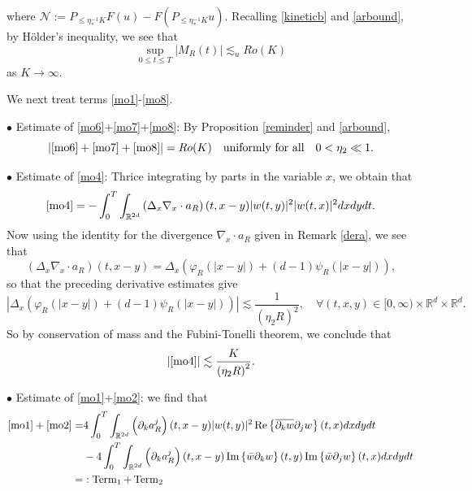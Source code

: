 \documentclass[reqno,11pt]{amsart}
\theoremstyle{plain}
\theoremstyle{definition}
\newcommand{\qtq}[1]{\quad\text{#1}\quad}
\numberwithin{equation}{section}
\numberwithin{theorem}{section}
\def\leq{\leqslant}
\begin{document}
where $\mathcal{N}:=P_{\leq \eta_{\ast}^{-1}K}F(u)-F(P_{\leq \eta_{\ast}^{-1}K}u)$. Recalling \eqref{kineticb} and \eqref{arbound}, by H\"older's inequality, we see that
\begin{equation}\label{F-est1}
    \sup_{0\leq t\leq T}|M_{R}(t)|\lesssim_u Ro(K)
\end{equation}
as $K\to\infty$.

We next treat  terms \eqref{mo1}-\eqref{mo8}.

$\bullet$ Estimate of \eqref{mo6}+\eqref{mo7}+\eqref{mo8}: By Proposition \ref{reminder} and \eqref{arbound}, 
    \begin{equation}\label{F-est2}
        |\eqref{mo6}+\eqref{mo7}+\eqref{mo8}|=Ro(K)\qtq{uniformly for all}0<\eta_2\ll1.
    \end{equation}


$\bullet$ Estimate of \eqref{mo4}: Thrice integrating by parts in the variable $x$, we obtain that
\begin{equation*}
\eqref{mo4}=-\int_{0}^{T} \int_{\mathbb{R}^{2d}}\left(\Delta_{x} \nabla_{x} \cdot a_{R}\right)(t, x-y)|w(t, y)|^{2}|w(t, x)|^{2} d x d y d t.
\end{equation*}
Now using the identity for the divergence $\nabla_{x} \cdot a_{R}$ given in Remark \ref{dera}, we see that
\begin{equation*}
\left(\Delta_{x} \nabla_{x} \cdot a_{R}\right)(t, x-y)= \Delta_{x}\left(\varphi_{R}\left(|x-y|\right)+(d-1) \psi_{R}(|x-y|)\right), 
\end{equation*}
so that the preceding derivative estimates give
\begin{equation*}
\left|\Delta_{x}\left(\varphi_{R}\left(|x-y|\right)+(d-1) \psi_{R}(|x-y|)\right)\right| \lesssim \frac{1}{\left(\eta_{2} R\right)^{2}}, \quad \forall(t, x, y) \in[0, \infty) \times \mathbb{R}^{d} \times \mathbb{R}^{d} . 
\end{equation*}
So by conservation of mass and the Fubini-Tonelli theorem, we conclude that
\begin{equation}\label{F-est3}
   |\eqref{mo4}|\lesssim  \frac{K}{\left(\eta_{2} R\right)^{2}} . 
\end{equation}

 $\bullet$ Estimate of \eqref{mo1}+\eqref{mo2}:  we find that
\begin{align*}
\eqref{mo1}+\eqref{mo2}= & 4 \int_{0}^{T} \int_{\mathbb{R}^{2d}}\left(\partial_{k} a_{R}^{j}\right)(t, x-y)|w(t, y)|^{2} \operatorname{Re}\left\{\overline{\partial_{k} w} \partial_{j} w\right\}(t, x) d x d y d t \\
& -4 \int_{0}^{T} \int_{\mathbb{R}^{2d}}\left(\partial_{k} a_{R}^{j}\right)(t, x-y) \operatorname{Im}\left\{\bar{w} \partial_{k} w\right\}(t, y) \operatorname{Im}\left\{\bar{w} \partial_{j} w\right\}\left(t, x) dx d y d t\right. \\
= & : \operatorname{Term}_1+\operatorname{Term}_2 
\end{align*}
\end{document}
